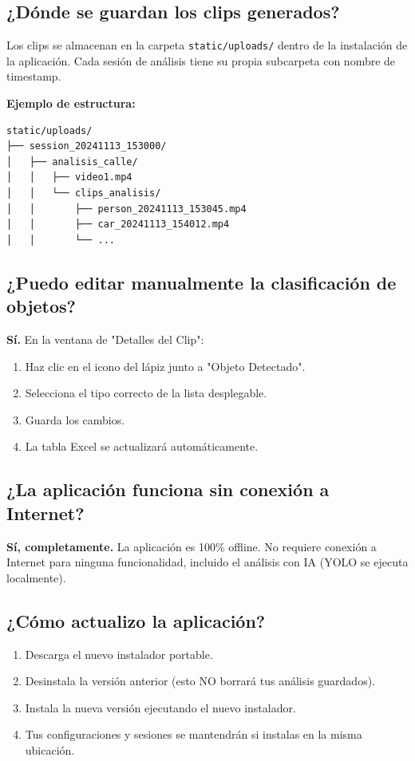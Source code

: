 \documentclass[11pt,a4paper]{article}
\begin{document}
\subsection{¿Dónde se guardan los clips generados?}

Los clips se almacenan en la carpeta \texttt{static/uploads/} dentro de la instalación de la aplicación. Cada sesión de análisis tiene su propia subcarpeta con nombre de timestamp.

\textbf{Ejemplo de estructura:}
\begin{verbatim}
static/uploads/
├── session_20241113_153000/
│   ├── analisis_calle/
│   │   ├── video1.mp4
│   │   └── clips_analisis/
│   │       ├── person_20241113_153045.mp4
│   │       ├── car_20241113_154012.mp4
│   │       └── ...
\end{verbatim}

\subsection{¿Puedo editar manualmente la clasificación de objetos?}

\textbf{Sí.} En la ventana de "Detalles del Clip":
\begin{enumerate}
    \item Haz clic en el icono del lápiz junto a "Objeto Detectado".
    \item Selecciona el tipo correcto de la lista desplegable.
    \item Guarda los cambios.
    \item La tabla Excel se actualizará automáticamente.
\end{enumerate}

\subsection{¿La aplicación funciona sin conexión a Internet?}

\textbf{Sí, completamente.} La aplicación es 100\% offline. No requiere conexión a Internet para ninguna funcionalidad, incluido el análisis con IA (YOLO se ejecuta localmente).

\subsection{¿Cómo actualizo la aplicación?}

\begin{enumerate}
    \item Descarga el nuevo instalador portable.
    \item Desinstala la versión anterior (esto NO borrará tus análisis guardados).
    \item Instala la nueva versión ejecutando el nuevo instalador.
    \item Tus configuraciones y sesiones se mantendrán si instalas en la misma ubicación.
\end{enumerate}
\end{document}
